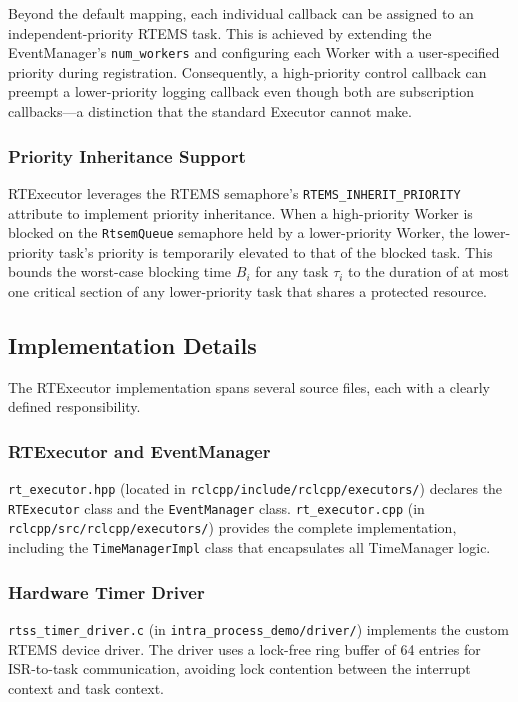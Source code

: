 Beyond the default mapping, each individual callback can be assigned to an independent-priority RTEMS task.  This is achieved by extending the EventManager's \texttt{num\_workers} and configuring each Worker with a user-specified priority during registration.  Consequently, a high-priority control callback can preempt a lower-priority logging callback even though both are subscription callbacks---a distinction that the standard Executor cannot make.

\subsubsection{Priority Inheritance Support}

RTExecutor leverages the RTEMS semaphore's \texttt{RTEMS\_INHERIT\_PRIORITY} attribute to implement priority inheritance.  When a high-priority Worker is blocked on the \texttt{RtsemQueue} semaphore held by a lower-priority Worker, the lower-priority task's priority is temporarily elevated to that of the blocked task.  This bounds the worst-case blocking time $B_i$ for any task $\tau_i$ to the duration of at most one critical section of any lower-priority task that shares a protected resource.

\subsection{Implementation Details}

The RTExecutor implementation spans several source files, each with a clearly defined responsibility.

\subsubsection{RTExecutor and EventManager}

\texttt{rt\_executor.hpp} (located in \texttt{rclcpp/include/rclcpp/executors/}) declares the \texttt{RTExecutor} class and the \texttt{EventManager} class.  \texttt{rt\_executor.cpp} (in \texttt{rclcpp/src/rclcpp/executors/}) provides the complete implementation, including the \texttt{TimeManagerImpl} class that encapsulates all TimeManager logic.

\subsubsection{Hardware Timer Driver}

\texttt{rtss\_timer\_driver.c} (in \texttt{intra\_process\_demo/driver/}) implements the custom RTEMS device driver.  The driver uses a lock-free ring buffer of 64 entries for ISR-to-task communication, avoiding lock contention between the interrupt context and task context.

